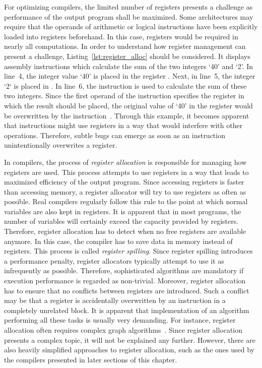 For optimizing compilers, the limited number of registers presents a challenge as performance of the output program shall be maximized.
Some architectures may require that the operands of arithmetic or logical instructions have been explicitly loaded into registers beforehand.
In this case, registers would be required in nearly all computations.
In order to understand how register management can present a challenge, Listing~\ref{lst:register_alloc} should be considered.
It displays \riscv{} assembly instructions which calculate the sum of the two integers `40' and `2'.
In line~4, the integer value `40' is placed in the register .
Next, in line~5, the integer `2` is placed in .
In line~6, the  instruction is used to calculate the sum of these two integers.
Since the first operand of the instruction specifies the register in which the result should be placed,
the original value of `40' in the register  would be overwritten by the instruction~\cite[Reference Card]{Patterson2017}.
Through this example, it becomes apparent that instructions might use registers in a way that would interfere with other operations.
Therefore, subtle bugs can emerge as soon as an instruction unintentionally overwrites a register.

In compilers, the process of \emph{register allocation} is responsible for managing how registers are used.
This process attempts to use registers in a way that leads to maximized efficiency of the output program.
Since accessing registers is faster than accessing memory, a register allocator will try to use registers as often as possible.
Real compilers regularly follow this%
%
%
rule to the point at which normal variables are also kept in registers.
It is apparent that in most programs, the number of variables will certainly exceed the capacity provided by registers.
Therefore, register allocation has to detect when no free registers are available anymore.
In this case, the compiler has to save data in memory instead of registers.
This process is called \emph{register spilling}.
Since register spilling introduces a performance penalty, register allocators typically attempt to use it as infrequently as possible.
Therefore, sophisticated algorithms are mandatory if execution performance is regarded as non-trivial.
Moreover, register allocation has to ensure that no conflicts between registers are introduced.
Such a conflict may be that a register is accidentally overwritten by an instruction in a completely unrelated block.
It is apparent that implementation of an algorithm performing all these tasks is usually very demanding.
For instance, register allocation often requires complex graph algorithms~\cite[pp.212-214]{Watson2017}.
Since register allocation presents a complex topic, it will not be explained any further.
However, there are also heavily simplified approaches to register allocation,
such as the ones used by the compilers presented in later sections of this chapter.

